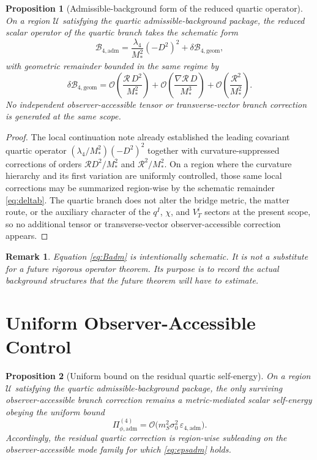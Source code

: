 \documentclass[11pt]{article}
\newtheorem{proposition}{Proposition}
\newtheorem{remark}{Remark}
\begin{document}
\begin{proposition}[Admissible-background form of the reduced quartic operator]
On a region \(\mathcal U\) satisfying the quartic admissible-background package, the reduced scalar operator of the quartic branch takes the schematic form
\begin{equation}
\mathcal B_{4,\mathrm{adm}}
=
\frac{\lambda_4}{M_*^2}(-D^2)^2
+ \delta\mathcal B_{4,\mathrm{geom}},
\label{eq:Badm}
\end{equation}
with geometric remainder bounded in the same regime by
\begin{equation}
\delta\mathcal B_{4,\mathrm{geom}}
=
\mathcal O\!\left(\frac{\mathcal R\,D^2}{M_*^2}\right)
+ \mathcal O\!\left(\frac{\nabla\mathcal R\,D}{M_*^3}\right)
+ \mathcal O\!\left(\frac{\mathcal R^2}{M_*^2}\right).
\label{eq:deltab}
\end{equation}
No independent observer-accessible tensor or transverse-vector branch correction is generated at the same scope.
\end{proposition}

\begin{proof}
The local continuation note already established the leading covariant quartic operator \((\lambda_4/M_*^2)(-D^2)^2\) together with curvature-suppressed corrections of orders \(\mathcal R D^2/M_*^2\) and \(\mathcal R^2/M_*^2\). On a region where the curvature hierarchy and its first variation are uniformly controlled, those same local corrections may be summarized region-wise by the schematic remainder \eqref{eq:deltab}. The quartic branch does not alter the bridge metric, the matter route, or the auxiliary character of the \(q^I\), \(\chi\), and \(V_T^i\) sectors at the present scope, so no additional tensor or transverse-vector observer-accessible correction appears.
\end{proof}

\begin{remark}
Equation \eqref{eq:Badm} is intentionally schematic. It is not a substitute for a future rigorous operator theorem. Its purpose is to record the actual background structures that the future theorem will have to estimate.
\end{remark}

\section{Uniform Observer-Accessible Control}

\begin{proposition}[Uniform bound on the residual quartic self-energy]
On a region \(\mathcal U\) satisfying the quartic admissible-background package, the only surviving observer-accessible branch correction remains a metric-mediated scalar self-energy obeying the uniform bound
\begin{equation}
\Pi_{\phi,\mathrm{adm}}^{(4)}
=
\mathcal O\!\bigl(m_S^2\sigma_0^2\,\varepsilon_{4,\mathrm{adm}}\bigr).
\label{eq:Piadm}
\end{equation}
Accordingly, the residual quartic correction is region-wise subleading on the observer-accessible mode family for which \eqref{eq:epsadm} holds.
\end{proposition}
\end{document}
